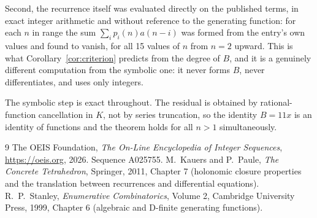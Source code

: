 \documentclass[11pt,a4paper]{article}
\theoremstyle{plain}
\theoremstyle{definition}
\begin{document}
Second, the recurrence itself was evaluated directly on the published terms, in exact
integer arithmetic and without reference to the generating function: for each $n$ in range
the sum $\sum_{i}p_{i}(n)a(n-i)$ was formed from the entry's own values and found to
vanish, for all 15 values of $n$ from $n=2$ upward. This is what
Corollary~\ref{cor:criterion} predicts from the degree of $B$, and it is a genuinely
different computation from the symbolic one: it never forms $B$, never differentiates, and
uses only integers.

The symbolic step is exact throughout. The residual is obtained by rational-function
cancellation in $K$, not by series truncation, so the identity $B=11 x$ is an
identity of functions and the theorem holds for all $n>1$ simultaneously.

\begin{thebibliography}{9}
 The OEIS Foundation, \emph{The On-Line Encyclopedia of Integer Sequences},
\url{https://oeis.org}, 2026. Sequence A025755.
 M.~Kauers and P.~Paule, \emph{The Concrete Tetrahedron}, Springer, 2011,
Chapter 7 (holonomic closure properties and the translation between recurrences and
differential equations).
 R.~P.~Stanley, \emph{Enumerative Combinatorics}, Volume 2, Cambridge
University Press, 1999, Chapter 6 (algebraic and D-finite generating functions).
\end{thebibliography}
\end{document}

